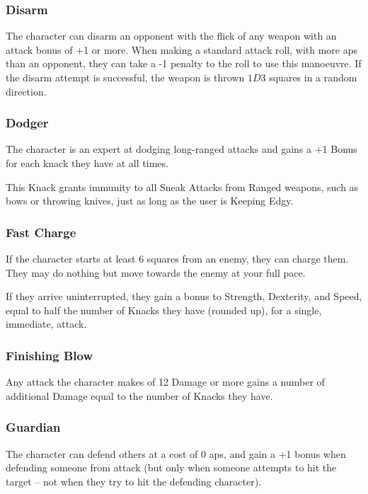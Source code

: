 \begin{multicols}{2}
\subsubsection{Disarm}

The character can disarm an opponent with the flick of any weapon with an attack bonus of +1 or more.
When making a standard attack roll, with more \glspl{ap} than an opponent, they can take a -1 penalty to the roll to use this manoeuvre.
If the disarm attempt is successful, the weapon is thrown $1D3$ squares in a random direction.

\subsubsection{Dodger}
\label{dodger}

The character is an expert at dodging long-ranged attacks and gains a +1 Bonus for each knack they have at all times.

This Knack grants immunity to all Sneak Attacks from Ranged weapons, such as bows or throwing knives, just as long as the user is Keeping Edgy.

\subsubsection{Fast Charge}

If the character starts at least 6 squares from an enemy, they can charge them.
They may do nothing but move towards the enemy at your full pace.

If they arrive uninterrupted, they gain a bonus to Strength, Dexterity, and Speed, equal to half the number of Knacks they have (rounded up), for a single, immediate, attack.

\subsubsection{Finishing Blow}\label{finishingblow}

Any attack the character makes of 12 Damage or more gains a number of additional Damage equal to the number of Knacks they have.

\subsubsection{Guardian}

The character can defend others at a cost of 0 \glspl{ap}, and gain a +1 bonus when defending someone from attack (but only when someone attempts to hit the target -- not when they try to hit the defending character).


\end{multicols}
